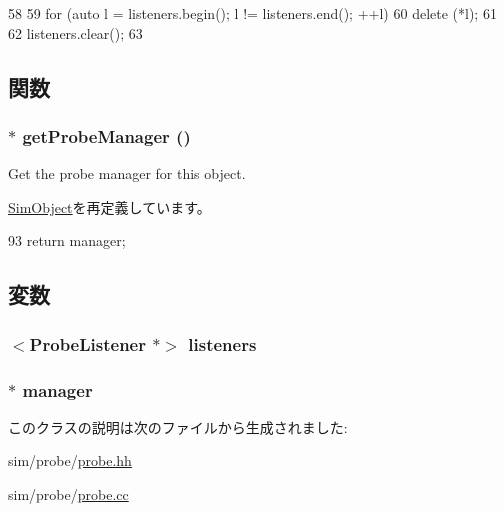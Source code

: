 \begin{DoxyCode}
58 {
59     for (auto l = listeners.begin(); l != listeners.end(); ++l) {
60         delete (*l);
61     }
62     listeners.clear();
63 }
\end{DoxyCode}


\subsection{関数}
\hypertarget{classProbeListenerObject_a4cdf821c3b87d8c0440d271b602fcdb5}{
\subsubsection[{getProbeManager}]{$\ast$ getProbeManager ()}}
\label{classProbeListenerObject_a4cdf821c3b87d8c0440d271b602fcdb5}
Get the probe manager for this object. 

\hyperlink{classSimObject_aca474da5df36cfb4df4bfcdbb4df8bf9}{SimObject}を再定義しています。


\begin{DoxyCode}
93 { return manager; }
\end{DoxyCode}


\subsection{変数}
\hypertarget{classProbeListenerObject_a86ce4804fd801153a4a7dd78761958ab}{
\subsubsection[{listeners}]{$<${\bf ProbeListener} $\ast$$>$ {\bf listeners}}}
\label{classProbeListenerObject_a86ce4804fd801153a4a7dd78761958ab}
\hypertarget{classProbeListenerObject_ab41bb1945c343464666bb792599747c2}{
\subsubsection[{manager}]{$\ast$ {\bf manager}}}
\label{classProbeListenerObject_ab41bb1945c343464666bb792599747c2}


このクラスの説明は次のファイルから生成されました:\begin{DoxyCompactItemize}
\item 
sim/probe/\hyperlink{probe_8hh}{probe.hh}\item 
sim/probe/\hyperlink{probe_8cc}{probe.cc}\end{DoxyCompactItemize}
